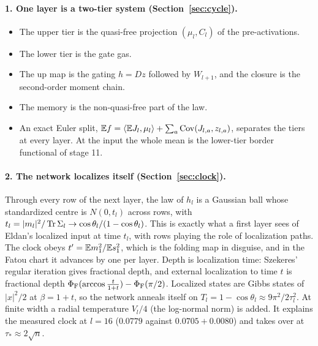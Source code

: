 \label{sec:summary}
\paragraph{1. One layer is a two-tier system (Section~\ref{sec:cycle}).}
\begin{itemize}[leftmargin=*]
\item The upper tier is the quasi-free projection $(\mu_l,C_l)$ of the pre-activations.
\item The lower tier is the gate gas.
\item The up map is the gating $h=Dz$ followed by $W_{l+1}$, and the closure is the second-order moment chain.
\item The memory is the non-quasi-free part of the law.
\item An exact Euler split, $\mathbb E f=\langle\mathbb E J_l,\mu_l\rangle+\sum_a\operatorname{Cov}(J_{l,a},z_{l,a})$, separates the tiers at every layer. At the input the whole
mean is the lower-tier border functional of stage 11.
\end{itemize}

\paragraph{2. The network localizes itself (Section~\ref{sec:clock}).} Through every row of the next layer, the law of $h_l$ is a Gaussian
ball whose standardized centre is $N(0,t_l)$ across rows, with $t_l=|m_l|^2/\operatorname{Tr}\Sigma_l\to\cos\theta_l/(1-\cos\theta_l)$. This is exactly what a
first layer sees of Eldan's localized input at time $t_l$, with rows playing the role of localization paths. The clock obeys
$t'=\mathbb E m_1^2/\mathbb E s_1^2$, which is the folding map in disguise, and in the Fatou chart it advances by one per layer. Depth is localization
time: Szekeres' regular iteration gives fractional depth, and external localization to time $t$ is fractional depth
$\Phi_{\mathrm F}(\arccos\frac t{1+t})-\Phi_{\mathrm F}(\pi/2)$. Localized states are Gibbs states of $|x|^2/2$ at $\beta=1+t$, so the network anneals itself on
$T_l=1-\cos\theta_l\approx9\pi^2/2\tau_l^2$. At finite width a radial temperature $V_l/4$ (the log-normal norm) is added. It explains the
measured clock at $l=16$ ($0.0779$ against $0.0705+0.0080$) and takes over at $\tau_*\approx2\sqrt n$.

